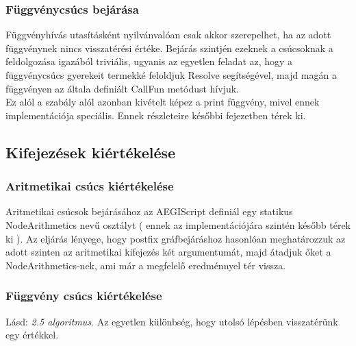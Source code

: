 \documentclass[a4paper,12pt]{report}
\begin{document}


\subsubsection{Függvénycsúcs bejárása}
Függvényhívás utasításként nyilvánvalóan csak akkor szerepelhet, ha az adott függvénynek nincs visszatérési értéke. Bejárás szintjén ezeknek a csúcsoknak a feldolgozása igazából triviális, ugyanis az egyetlen feladat az, hogy a függvénycsúcs gyerekeit termekké feloldjuk Resolve segítségével, majd magán a függvényen az általa definiált CallFun metódust hívjuk. \\
Ez alól a szabály alól azonban kivételt képez a print függvény, mivel ennek implementációja speciális. Ennek részleteire későbbi fejezetben térek ki. 





\subsection{Kifejezések kiértékelése}



\subsubsection{Aritmetikai csúcs kiértékelése}
Aritmetikai csúcsok bejárásához az AEGIScript definiál egy statikus NodeArithmetics nevű osztályt ( ennek az implementációjára szintén később térek ki ). Az eljárás lényege, hogy postfix gráfbejáráshoz hasonlóan meghatározzuk az adott szinten az aritmetikai kifejezés két argumentumát, majd átadjuk őket a NodeArithmetics-nek, ami már a megfelelő eredménnyel tér vissza.






\subsubsection{Függvény csúcs kiértékelése}
Lásd: \textit{2.5 algoritmus}. Az egyetlen különbség, hogy utolsó lépésben visszatérünk egy értékkel.
\end{document}

